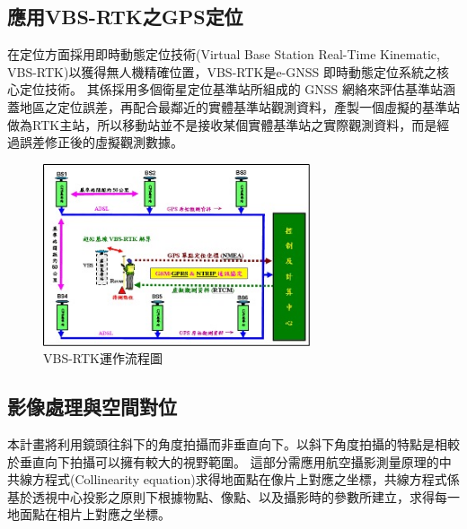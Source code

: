 \documentclass[12pt]{article}       %
\renewcommand{\figurename}{圖}                           %
\begin{document}
\subsection{應用VBS-RTK之GPS定位}
\hspace{2em}在定位方面採用即時動態定位技術(Virtual Base Station Real-Time Kinematic, VBS-RTK)以獲得無人機精確位置，VBS-RTK是e-GNSS 即時動態定位系統之核心定位技術。
其係採用多個衛星定位基準站所組成的 GNSS 網絡來評估基準站涵蓋地區之定位誤差，再配合最鄰近的實體基準站觀測資料，產製一個虛擬的基準站做為RTK主站，所以移動站並不是接收某個實體基準站之實際觀測資料，而是經過誤差修正後的虛擬觀測數據。

\begin{figure}[H]
    \centering
    \renewcommand{\figurename}{圖}                              %
    \includegraphics[width=0.7\textwidth]{vbsrtk.jpg}         %
    \caption{VBS-RTK運作流程圖\cite{egnss_2020}}           %
    \label{fig:vbsrtk}                                        %
\end{figure}

\subsection{影像處理與空間對位}
\hspace{2em}本計畫將利用鏡頭往斜下的角度拍攝而非垂直向下。以斜下角度拍攝的特點是相較於垂直向下拍攝可以擁有較大的視野範圍。
這部分需應用航空攝影測量原理\cite{zhao2013}的中共線方程式(Collinearity equation)求得地面點在像片上對應之坐標，共線方程式係基於透視中心投影之原則下根據物點、像點、以及攝影時的參數所建立，求得每一地面點在相片上對應之坐標。
\end{document}
